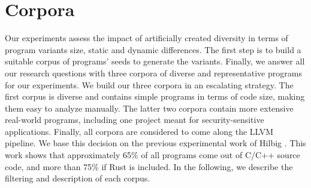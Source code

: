 

\section{Corpora}
\label{section:crow:corpora}

Our experiments assess the impact of artificially created diversity in terms of program variants size, static and dynamic differences. The first step is to build a suitable corpus of programs' seeds to generate the variants. Finally, we answer all our research questions with three corpora of diverse and representative programs for our experiments. 
We build our three corpora in an escalating strategy. The first corpus is diverse and contains simple programs in terms of code size, making them easy to analyze manually. The latter two corpora contain more extensive real-world programs, including one project meant for security-sensitive applications. Finally, all corpora are considered to come along the LLVM pipeline. We base this decision on the previous experimental work of Hilbig \etal \cite{Hilbig2021AnES}. This work shows that approximately 65\% of all \wasm programs come out of C/C++ source code, and more than 75\% if Rust is included. In the following, we describe the filtering and description of each corpus.

